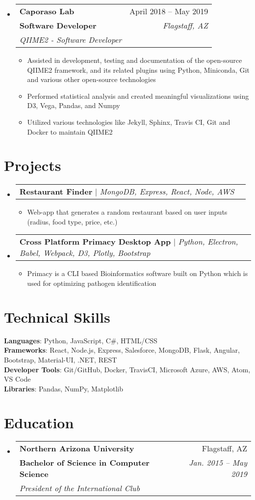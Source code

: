 \documentclass[letterpaper,11pt]{article}
\makeatletter
\newcommand{\resumeItem}[1]{
  \item\small{
    {#1 \vspace{-2pt}}
  }
}
\newcommand{\resumeSubheading}[5]{
  \vspace{-2pt}\item
    \begin{tabular*}{0.97\textwidth}[t]{l@{\extracolsep{\fill}}r}
      \textbf{#1} & #2 \\
      \textbf{\small#3} & \textit{\small #4} \\
      \textit{\small#5} \\
    \end{tabular*}\vspace{-7pt}
}
\newcommand{\resumeProjectHeading}[2]{
    \item
    \begin{tabular*}{0.97\textwidth}{l@{\extracolsep{\fill}}r}
      \small#1 & #2 \\
    \end{tabular*}\vspace{-7pt}
}
\newcommand{\resumeSubHeadingListStart}{\begin{itemize}[leftmargin=0.15in, label={}]}
\newcommand{\resumeSubHeadingListEnd}{\end{itemize}}
\newcommand{\resumeItemListStart}{\begin{itemize}}
\newcommand{\resumeItemListEnd}{\end{itemize}\vspace{-5pt}}
\makeatother
\begin{document}
\resumeSubHeadingListStart
\resumeSubheading
{Caporaso Lab}{April 2018 -- May 2019}
{Software Developer}{Flagstaff, AZ}
{QIIME2 - Software Developer}
\resumeItemListStart
\resumeItem{Assisted in development, testing and documentation of the open-source QIIME2 framework, and its related plugins using Python, Miniconda, Git and various other open-source technologies}
\resumeItem{Performed statistical analysis and created meaningful visualizations using D3, Vega, Pandas, and Numpy}
\resumeItem{Utilized various technologies like Jekyll, Sphinx, Travis CI, Git and Docker to maintain QIIME2}
\resumeItemListEnd
\resumeSubHeadingListEnd

\section{Projects}
\resumeSubHeadingListStart
\resumeProjectHeading
{\textbf{Restaurant Finder} $|$ \emph{MongoDB, Express, React, Node, AWS}}{}
\resumeItemListStart
\resumeItem{Web-app that generates a random restaurant based on user inputs (radius, food type, price, etc.)}
\resumeItemListEnd
\resumeProjectHeading
{\textbf{Cross Platform Primacy Desktop App} $|$ \emph{Python, Electron, Babel, Webpack, D3, Plotly, Bootstrap}}{}
\resumeItemListStart
\resumeItem{Primacy is a CLI based Bioinformatics software built on Python which is used for optimizing pathogen identification}
\resumeItemListEnd
\resumeSubHeadingListEnd


\section{Technical Skills}
\begin{itemize}[leftmargin=0.15in, label={}]
 \small{\item{
       \textbf{Languages}{: Python, JavaScript, C\#, HTML/CSS} \\
       \textbf{Frameworks}{: React, Node.js, Express, Salesforce, MongoDB, Flask, Angular, Bootstrap, Material-UI, .NET, REST} \\
       \textbf{Developer Tools}{: Git/GitHub, Docker, TravisCI, Microsoft Azure, AWS, Atom, VS Code} \\
       \textbf{Libraries}{: Pandas, NumPy, Matplotlib}
       }}
\end{itemize}

\section{Education}
\resumeSubHeadingListStart
\resumeSubheading
{Northern Arizona University}{Flagstaff, AZ}
{Bachelor of Science in Computer Science}{Jan. 2015 -- May 2019}
{President of the International Club}
\resumeSubHeadingListEnd



\end{document}
